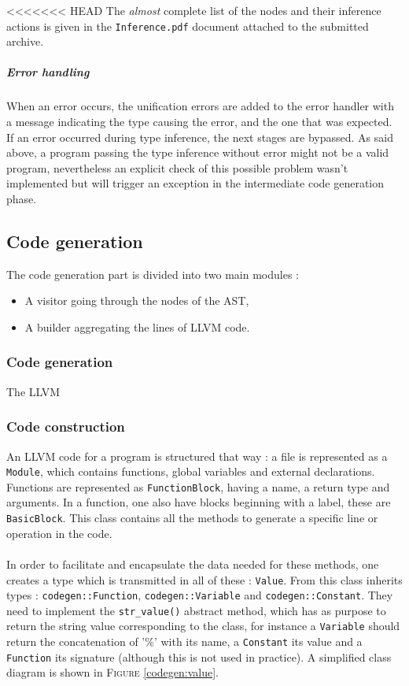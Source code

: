 \documentclass[a4paper,11pt]{article}
\begin{document}
<<<<<<< HEAD
The \textit{almost} complete list of the nodes and their inference actions is given in the \texttt{Inference.pdf} document attached to the submitted archive.
\subparagraph{Error handling} When an error occurs, the unification errors are added to the error handler with a message indicating the type causing the error, and the one that was expected. If an error occurred during type inference, the next stages are bypassed. As said above, a program passing the type inference without error might not be a valid program, nevertheless an explicit check of this possible problem wasn't implemented but will trigger an exception in the intermediate code generation phase.
\subsection{Code generation}

The code generation part is divided into two main modules : 
\begin{itemize}
	\item A visitor going through the nodes of the AST,
	\item A builder aggregating the lines of LLVM code.
\end{itemize}

	\subsubsection{Code generation}

The LLVM


	\subsubsection{Code construction}

An LLVM code for a program is structured that way : a file is represented as a \texttt{Module}, which contains functions, global variables and external declarations. Functions are represented as \texttt{FunctionBlock}, having a name, a return type and arguments. In a function, one also have blocks beginning with a label, these are \texttt{BasicBlock}. This class contains all the methods to generate a specific line or operation in the code. 

\paragraph{}

In order to facilitate and encapsulate the data needed for these methods, one creates a type which is transmitted in all of these : \texttt{Value}. From this class inherits types : \texttt{codegen::Function}, \texttt{codegen::Variable} and \texttt{codegen::Constant}. They need to implement the \texttt{str\_value()} abstract method, which has as purpose to return the string value corresponding to the class, for instance a \texttt{Variable} should return the concatenation of '\%' with its name, a \texttt{Constant} its value and a \texttt{Function} its signature (although this is not used in practice). A simplified class diagram is shown in \textsc{Figure} \ref{codegen:value}.
\end{document}
